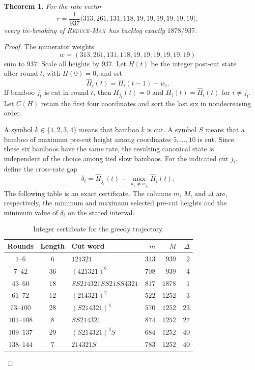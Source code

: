 \documentclass[11pt]{amsart}
\newtheorem{theorem}{Theorem}
\theoremstyle{remark}
\newcommand{\RM}{\textnormal{\textsc{Reduce-Max}}}
\begin{document}
\begin{theorem}\label{thm:main}
For the rate vector
\[
 r=\frac{1}{937}
 \bigl(313,261,131,118,19,19,19,19,19,19\bigr),
\]
every tie-breaking of \RM\ has backlog exactly $1878/937$.
\end{theorem}

\begin{proof}
The numerator weights
\[
w=(313,261,131,118,19,19,19,19,19,19)
\]
sum to $937$. Scale all heights by $937$. Let $H(t)$ be the integer
post-cut state after round $t$, with $H(0)=0$, and set
\[
\widehat H_i(t)=H_i(t-1)+w_i.
\]
If bamboo $j_t$ is cut in round $t$, then
$H_{j_t}(t)=0$ and $H_i(t)=\widehat H_i(t)$ for $i\ne j_t$.
Let $C(H)$ retain the first four coordinates and sort the last six in
nondecreasing order.

A symbol $k\in\{1,2,3,4\}$ means that bamboo $k$ is cut. A symbol $S$
means that a bamboo of maximum pre-cut height among coordinates
$5,\dots,10$ is cut. Since these six bamboos have the same rate, the
resulting canonical state is independent of the choice among tied
slow bamboos. For the indicated cut $j_t$, define the cross-rate gap
\[
\delta_t=
\widehat H_{j_t}(t)-
\max_{\,w_i\ne w_{j_t}}\widehat H_i(t).
\]
The following table is an exact certificate. The columns $m$, $M$,
and $\Delta$ are, respectively, the minimum and maximum selected
pre-cut heights and the minimum value of $\delta_t$ on the stated
interval.

\begin{table}[ht]
\centering
\caption{Integer certificate for the greedy trajectory.}
\label{tab:certificate}
\begin{tabular}{@{}cclrrr@{}}
\toprule
Rounds & Length & Cut word & $m$ & $M$ & $\Delta$ \\
\midrule
$1$--$6$     & $6$  & $121321$             & $313$ & $939$  & $2$  \\
$7$--$42$    & $36$ & $(421321)^6$         & $708$ & $939$  & $4$  \\
$43$--$60$   & $18$ & $SS214321SS21SS4321$ & $817$ & $1878$ & $1$  \\
$61$--$72$   & $12$ & $(214321)^2$         & $522$ & $1252$ & $3$  \\
$73$--$100$  & $28$ & $(S214321)^4$        & $570$ & $1252$ & $23$ \\
$101$--$108$ & $8$  & $SS214321$           & $874$ & $1252$ & $27$ \\
$109$--$137$ & $29$ & $(S214321)^4S$       & $684$ & $1252$ & $40$ \\
$138$--$144$ & $7$  & $214321S$            & $783$ & $1252$ & $40$ \\
\bottomrule
\end{tabular}
\end{table}


\end{proof}
\end{document}
